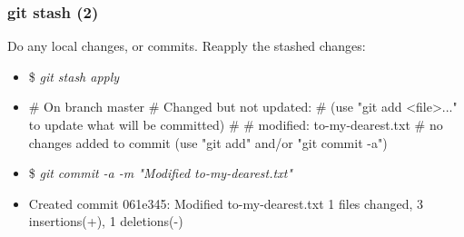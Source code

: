 \documentclass[10pt]{beamer}
\newcommand{\command}[1]{\textsl{\textit{#1}}}
\begin{document}
%
%

\begin{frame}[fragile]
\frametitle{git stash (2)}
Do any local changes, or commits. Reapply the stashed changes:
\begin{block}{}
\scriptsize
\begin{semiverbatim}
\begin{itemize}[<+-| alert@+>]
\item[]{\$ \command{git stash apply}}
\item[]{# On branch master
# Changed but not updated:
#   (use "git add <file>..." to update what will be committed)
#
#	modified:   to-my-dearest.txt
#
no changes added to commit (use "git add" and/or "git commit -a")}

\item[]{\$ \command{git commit -a -m "Modified to-my-dearest.txt"}}
\item[]{Created commit 061e345: Modified to-my-dearest.txt
 1 files changed, 3 insertions(+), 1 deletions(-)}
\end{itemize}
\end{semiverbatim}
\end{block}

\end{frame}

%
%
\end{document}
